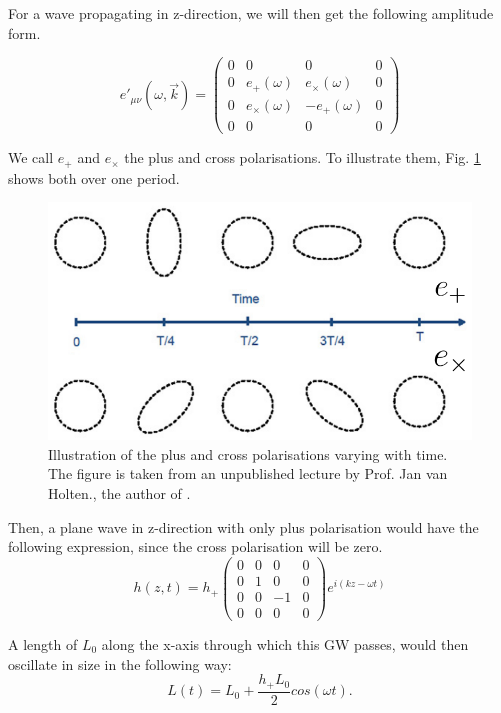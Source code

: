 For a wave propagating in z-direction, we will then get the following amplitude form.

\begin{equation}
    e'_{\mu\nu}(\omega, \vec{k})=
    \begin{pmatrix}
        0 & 0 & 0 & 0 \\
        0 & e_+(\omega) & e_\times(\omega) & 0 \\ 
        0 & e_\times(\omega) & -e_+(\omega) & 0 \\
        0 & 0 & 0 & 0
    \end{pmatrix}
\end{equation}

We call $e_+$ and $e_\times$ the plus and cross polarisations. To illustrate them, Fig. \ref{polarisation} shows both over one period.

\begin{figure}[h]
    \centering
    \includegraphics[width=0.4\linewidth]{Images/polarisations.png}
    \caption[Illustration of the plus and cross polarisations varying with time.]{Illustration of the plus and cross polarisations varying with time. The figure is taken from an unpublished lecture by Prof. Jan van Holten., the author of \cite{van_holten_gravitational_2019}.}
    \label{polarisation}
\end{figure} 


Then, a plane wave in z-direction with only plus polarisation would have the following expression, since the cross polarisation will be zero.
\begin{equation}
    h(z, t) = h_+ 
    \begin{pmatrix}
        0 & 0 & 0 & 0 \\
        0 &1 & 0 & 0 \\
        0 & 0 & -1 & 0 \\
        0 &  0 & 0 & 0
    \end{pmatrix}
    e^{i(k z-\omega t)}
\end{equation}

A length of $L_0$ along the x-axis through which this GW passes, would then oscillate in size in the
following way:
\begin{equation}
    L(t) = L_0 + \frac{h_+ L_0}{2} cos(\omega t).
\end{equation}


